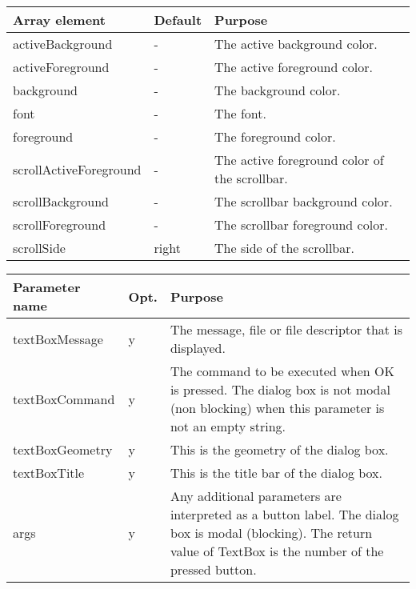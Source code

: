 {\newpage
\clearpage
\samepage \begin{tabular}{|l|l|p{5.5cm}|} \hline
Array element          & Default & Purpose \\  \hline
activeBackground       & -       & The active background
                                   color. \\  \hline
activeForeground       & -       & The active foreground
                                   color. \\  \hline
background             & -       & The background color. \\  \hline
font                   & -       & The font. \\  \hline
foreground             & -       & The foreground color. \\  \hline
scrollActiveForeground & -       & The active foreground
                                   color of the scrollbar.\\  \hline 
scrollBackground       & -       & The scrollbar background
                                   color. \\  \hline
scrollForeground       & -       & The scrollbar foreground
                                   color. \\  \hline
scrollSide             & right   & The side of the
                                   scrollbar. \\  \hline
\end{tabular}
}

{\newpage
\clearpage
\samepage \begin{figure}[ht]
  \centerline{
  \epsfysize=4cm
  }
  
  \label{fig:ReadBox}
\end{figure}
}

{\newpage
\clearpage
\samepage \begin{tabular}{|l|l|p{6.5cm}|} \hline
Parameter name  & Opt. & Purpose\\  \hline
textBoxMessage  & y    & The message, file or file
                         descriptor that is displayed.\\  \hline
textBoxCommand  & y    & The command to be executed when OK
                         is pressed. The dialog box is not
                         modal (non blocking) when this
                         parameter is not an empty
                         string.\\  \hline
textBoxGeometry & y    & This is the geometry of the dialog
                         box.\\  \hline 
textBoxTitle    & y    & This is the title bar of the dialog
                         box.\\  \hline 
args            & y    & Any additional parameters are
                         interpreted as a button label. The
                         dialog box is modal (blocking).
                         The return value of TextBox
                         is the number of the pressed
                         button.\\  \hline
\end{tabular}
}

